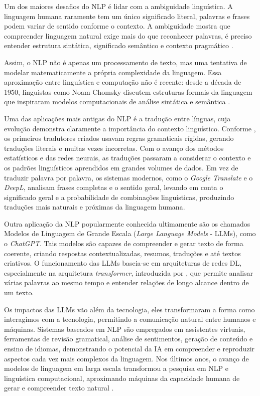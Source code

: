 Um dos maiores desafios do NLP é lidar com a ambiguidade linguística. A linguagem humana raramente tem um único significado literal, palavras e frases podem variar de sentido conforme o contexto. A ambiguidade mostra que compreender linguagem natural exige mais do que reconhecer palavras, é preciso entender estrutura sintática, significado semântico e contexto pragmático \cite{jurafsky2023speech}.

Assim, o NLP não é apenas um processamento de texto, mas uma tentativa de modelar matematicamente a própria complexidade da linguagem. Essa aproximação entre linguística e computação não é recente: desde a década de 1950, linguistas como Noam Chomsky discutem estruturas formais da linguagem que inspiraram modelos computacionais de análise sintática e semântica \cite{chomsky1957syntactic}.

Uma das aplicações mais antigas do NLP é a tradução entre línguas, cuja evolução demonstra claramente a importância do contexto linguístico. Conforme \textcite{hutchins2005history}, os primeiros tradutores criados usavam regras gramaticais rígidas, gerando traduções literais e muitas vezes incorretas.
Com o avanço dos métodos estatísticos e das redes neurais, as traduções passaram a considerar o contexto e os padrões linguísticos aprendidos em grandes volumes de dados.
Em vez de traduzir palavra por palavra, os sistemas modernos, como o \textit{Google Translate} e o \textit{DeepL}, analisam frases completas e o sentido geral, levando em conta o significado geral e a probabilidade de combinações linguísticas, produzindo traduções mais naturais e próximas da linguagem humana.

Outra aplicação da NLP popularmente conhecida ultimamente são os chamados Modelos de Linguagem de Grande Escala (\textit{Large Language Models} - LLMs), como o \textit{ChatGPT}. Tais modelos são capazes de compreender e gerar texto de forma coerente, criando respostas contextualizadas, resumos, traduções e até textos criativos. O funcionamento das LLMs baseia-se em arquiteturas de redes DL, especialmente na arquitetura  \textit{transformer}, introduzida por \textcite{vaswani2017attention}, que permite analisar várias palavras ao mesmo tempo e entender relações de longo alcance dentro de um texto.

Os impactos das LLMs vão além da tecnologia, eles transformaram a forma como interagimos com a tecnologia, permitindo a comunicação natural entre humanos e máquinas. Sistemas baseados em NLP são empregados em assistentes virtuais, ferramentas de revisão gramatical, análise de sentimentos, geração de conteúdo e ensino de idiomas, demonstrando o potencial da IA em compreender e reproduzir aspectos cada vez mais complexos da linguagem. Nos últimos anos, o avanço de modelos de linguagem em larga escala transformou a pesquisa em NLP e linguística computacional, aproximando máquinas da capacidade humana de gerar e compreender texto natural \cite{bommasani2021opportunities}.



